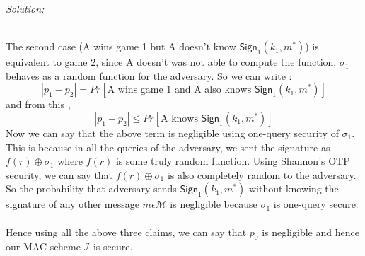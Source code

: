 \documentclass[a4paper, 11pt]{article}
\newenvironment{solution}
    {\textit{Solution:}}
    {\clearpage}
\newcommand{\sign}{\mathsf{Sign}}
\newcommand{\calI}{\mathcal{I}}
\newcommand{\calM}{\mathcal{M}}
\begin{document}
\begin{solution}
\begin{enumerate}[(a)]
              \\
              The second case (A wins game 1 but A doesn't know $\sign_1(k_1, m^*)$) is equivalent to game 2, since A doesn't was not able to compute the function, $\sigma_1$ behaves as a random function for the adversary. So we can write :
              $$|p_1 - p_2| = Pr[\text{A wins game 1 and A also knows $\sign_1(k_1, m^*)$}]$$ and from this ,
              $$|p_1 - p_2| \leq Pr[\text{A knows $\sign_1(k_1, m^*)$}]$$
              Now we can say that the above term is negligible using one-query security of $\sigma_1$. This is because in all the queries of the adversary, we sent the signature as $f(r) \oplus \sigma_1$ where $f(r)$ is some truly random function. Using Shannon's OTP security, we can say that $f(r) \oplus \sigma_1$ is also completely random to the adversary. So the probability that adversary sends $\sign_1(k_1, m^*)$ without knowing the signature of any other message $m \epsilon \calM$ is negligible because $\sigma_1$ is one-query secure. \\ \\
              Hence using all the above three claims, we can say that $p_0$ is negligible and hence our MAC scheme $\calI$ is secure.

    \end{enumerate}
\end{solution}
\end{document}
